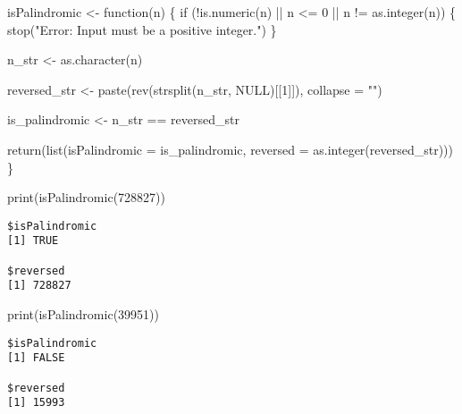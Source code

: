 \documentclass[
  letterpaper,
  DIV=11,
  numbers=noendperiod]{scrartcl}
\newenvironment{Shaded}{\begin{snugshade}}{\end{snugshade}}
\newcommand{\AttributeTok}[1]{\textcolor[rgb]{0.40,0.45,0.13}{#1}}
\newcommand{\ConstantTok}[1]{\textcolor[rgb]{0.56,0.35,0.01}{#1}}
\newcommand{\ControlFlowTok}[1]{\textcolor[rgb]{0.00,0.23,0.31}{#1}}
\newcommand{\DecValTok}[1]{\textcolor[rgb]{0.68,0.00,0.00}{#1}}
\newcommand{\FunctionTok}[1]{\textcolor[rgb]{0.28,0.35,0.67}{#1}}
\newcommand{\NormalTok}[1]{\textcolor[rgb]{0.00,0.23,0.31}{#1}}
\newcommand{\OtherTok}[1]{\textcolor[rgb]{0.00,0.23,0.31}{#1}}
\newcommand{\SpecialCharTok}[1]{\textcolor[rgb]{0.37,0.37,0.37}{#1}}
\newcommand{\StringTok}[1]{\textcolor[rgb]{0.13,0.47,0.30}{#1}}
\begin{document}
\begin{Shaded}
\begin{Highlighting}[]
\NormalTok{isPalindromic }\OtherTok{\textless{}{-}} \ControlFlowTok{function}\NormalTok{(n) \{}
  \ControlFlowTok{if}\NormalTok{ (}\SpecialCharTok{!}\FunctionTok{is.numeric}\NormalTok{(n) }\SpecialCharTok{||}\NormalTok{ n }\SpecialCharTok{\textless{}=} \DecValTok{0} \SpecialCharTok{||}\NormalTok{ n }\SpecialCharTok{!=} \FunctionTok{as.integer}\NormalTok{(n)) \{}
    \FunctionTok{stop}\NormalTok{(}\StringTok{"Error: Input must be a positive integer."}\NormalTok{)}
\NormalTok{  \}}
  
\NormalTok{  n\_str }\OtherTok{\textless{}{-}} \FunctionTok{as.character}\NormalTok{(n)}
  
\NormalTok{  reversed\_str }\OtherTok{\textless{}{-}} \FunctionTok{paste}\NormalTok{(}\FunctionTok{rev}\NormalTok{(}\FunctionTok{strsplit}\NormalTok{(n\_str, }\ConstantTok{NULL}\NormalTok{)[[}\DecValTok{1}\NormalTok{]]), }\AttributeTok{collapse =} \StringTok{""}\NormalTok{)}
  
\NormalTok{  is\_palindromic }\OtherTok{\textless{}{-}}\NormalTok{ n\_str }\SpecialCharTok{==}\NormalTok{ reversed\_str}
  
  \FunctionTok{return}\NormalTok{(}\FunctionTok{list}\NormalTok{(}\AttributeTok{isPalindromic =}\NormalTok{ is\_palindromic, }\AttributeTok{reversed =} \FunctionTok{as.integer}\NormalTok{(reversed\_str)))}
\NormalTok{\}}

\FunctionTok{print}\NormalTok{(}\FunctionTok{isPalindromic}\NormalTok{(}\DecValTok{728827}\NormalTok{))}
\end{Highlighting}
\end{Shaded}

\begin{verbatim}
$isPalindromic
[1] TRUE

$reversed
[1] 728827
\end{verbatim}

\begin{Shaded}
\begin{Highlighting}[]
\FunctionTok{print}\NormalTok{(}\FunctionTok{isPalindromic}\NormalTok{(}\DecValTok{39951}\NormalTok{))}
\end{Highlighting}
\end{Shaded}

\begin{verbatim}
$isPalindromic
[1] FALSE

$reversed
[1] 15993
\end{verbatim}
\end{document}

